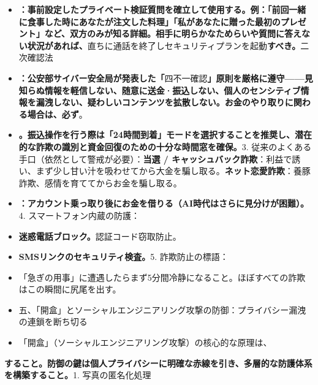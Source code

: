 \begin{itemize}
  \item \textbf{：事前設定したプライベート検証質問を確立して使用する。例：「前回一緒に食事した時にあなたが注文した料理」「私があなたに贈った最初のプレゼント」など、双方のみが知る詳細。相手に明らかなためらいや質問に答えない状況があれば、}直ちに通話を終了しセキュリティプランを起動\textbf{すべき。}二次確認法
  \item \textbf{：公安部サイバー安全局が発表した「}四不一確認\textbf{」原則を厳格に遵守——見知らぬ情報を軽信しない、随意に送金·振込しない、個人のセンシティブ情報を漏洩しない、疑わしいコンテンツを拡散しない。お金のやり取りに関わる場合は、必ず}。
  \item \textbf{。振込操作を行う際は「24時間到着」モードを選択することを推奨し、潜在的な詐欺の識別と資金回復のための十分な時間窓を確保。}3. 従来のよくある手口（依然として警戒が必要）：\textbf{当選 / キャッシュバック詐欺}：利益で誘い、まず少し甘い汁を吸わせてから大金を騙し取る。\textbf{ネット恋愛詐欺}：養豚詐欺、感情を育ててからお金を騙し取る。
\end{itemize}


\begin{itemize}
  \item \textbf{：アカウント乗っ取り後にお金を借りる（AI時代はさらに見分けが困難）。}4. スマートフォン内蔵の防護：
  \item \textbf{迷惑電話ブロック。}認証コード窃取防止。
  \item \textbf{SMSリンクのセキュリティ検査。}5. 詐欺防止の標語：
\end{itemize}


\begin{itemize}
  \item 「急ぎの用事」に遭遇したらまず5分間冷静になること。ほぼすべての詐欺はこの瞬間に尻尾を出す。
  \item 五、「開盒」とソーシャルエンジニアリング攻撃の防御：プライバシー漏洩の連鎖を断ち切る
  \item 「開盒」（ソーシャルエンジニアリング攻撃）の核心的な原理は、
\end{itemize}


\textbf{すること。防御の鍵は個人プライバシーに明確な赤線を引き、多層的な防護体系を構築すること。}1. 写真の匿名化処理

